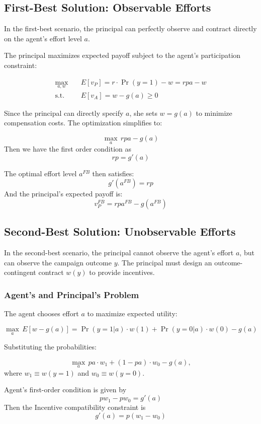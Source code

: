 \documentclass[11pt]{article}
\begin{document}
\subsection{First-Best Solution: Observable Efforts}

In the first-best scenario, the principal can perfectly observe and contract directly on the agent's effort level $a$.

The principal maximizes expected payoff subject to the agent's participation constraint:

\begin{align*}
\max_{a,w} \quad & E[v_P] = r \cdot \Pr(y=1) - w = r p a - w \\
\text{s.t.} \quad & E[v_A] = w - g(a) \geq 0
\end{align*}

Since the principal can directly specify $a$, she sets $w = g(a)$ to minimize compensation costs. The optimization simplifies to:

\[
\max_a \, r p a - g(a)
\]
Then we have the first order condition as
\[
r p = g'(a)
\]

The optimal effort level $a^{FB}$ then satisfies:
\[
g'(a^{FB}) = r p
\]
And the principal's expected payoff is:
\[
v_P^{FB} = r p a^{FB} - g(a^{FB})
\]

\subsection{Second-Best Solution: Unobservable Efforts}

In the second-best scenario, the principal cannot observe the agent's effort $a$, but can observe the campaign outcome $y$. The principal must design an outcome-contingent contract $w(y)$ to provide incentives.

\subsubsection{Agent's and Principal's Problem}
The agent chooses effort $a$ to maximize expected utility:

\[
\max_a \, E[w - g(a)] = \Pr(y=1|a) \cdot w(1) + \Pr(y=0|a) \cdot w(0) - g(a)
\]

Substituting the probabilities:

\[
\max_a \, p a \cdot w_1 + (1 - p a) \cdot w_0 - g(a),
\]
where $w_1 \equiv w(y=1)$ and $w_0 \equiv w(y=0)$.

Agent's first-order condition is given by
\[
p w_1 - p w_0 = g'(a)
\]
Then the Incentive compatibility constraint is
\[
g'(a) = p (w_1 - w_0)
\]
\end{document}

